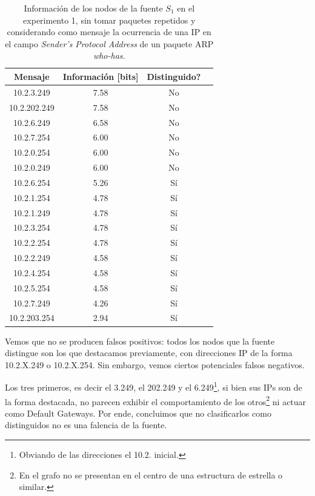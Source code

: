 \begin{table}[t]
    \centering
    \begin{tabular}{ | c | c | c | l |}
        \hline
        Mensaje & Información [bits] & Distinguido?\\
        \hline
        10.2.3.249 & 7.58 & No \\ %
        \hline
        10.2.202.249 & 7.58 & No \\ %
        \hline
        10.2.6.249 & 6.58 & No \\ %
        \hline
        10.2.7.254 & 6.00 & No \\
        \hline
        10.2.0.254 & 6.00 & No \\
        \hline
        10.2.0.249 & 6.00 & No \\
        \hline
        10.2.6.254 & 5.26 & Sí \\
        \hline
        10.2.1.254 & 4.78 & Sí \\
        \hline
        10.2.1.249 & 4.78 & Sí \\
        \hline
        10.2.3.254 & 4.78 & Sí \\
        \hline
        10.2.2.254 & 4.78 & Sí \\
        \hline
        10.2.2.249 & 4.58 & Sí \\
        \hline
        10.2.4.254 & 4.58 & Sí \\
        \hline
        10.2.5.254 & 4.58 & Sí \\
        \hline
        10.2.7.249 & 4.26 & Sí \\
        \hline
        10.2.203.254 & 2.94 & Sí \\
        \hline
    \end{tabular} 
    \caption{Información de los nodos de la fuente $S_1$ en el experimento 1, sin tomar paquetes repetidos y considerando como mensaje la ocurrencia de una IP en el campo \textit{Sender's Protocol Address} de un paquete ARP \textit{who-has}.}
    \label{tab1SinRSinA}
\end{table} 

\par Vemos que no se producen falsos positivos: todos los nodos que la fuente distingue son los que destacamos previamente, con direcciones IP de la forma 10.2.X.249 o 10.2.X.254.
Sin embargo, vemos ciertos potenciales falsos negativos.

\par Los tres primeros, es decir el 3.249, el 202.249 y el 6.249\footnote{Obviando de las direcciones el 10.2. inicial.}, si bien sus IPs son de la forma destacada, no parecen exhibir el comportamiento de los otros\footnote{En el grafo no se presentan en el centro de una estructura de estrella o similar.} ni actuar como Default Gateways.
Por ende, concluimos que no clasificarlos como distinguidos no es una falencia de la fuente.

